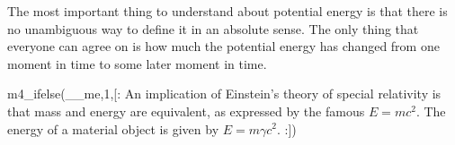 \begin{summary}
\begin{summarytext}
The most important thing to understand about potential
energy is that there is no unambiguous way to define it in
an absolute sense. The only thing that everyone can agree on
is how much the potential energy has changed from one moment
in time to some later moment in time.

m4_ifelse(__me,1,[:%
An implication of Einstein's theory of special relativity is that
mass and energy are equivalent, as expressed by the famous
$E=mc^2$. The energy of a material object is given by $E=m\gamma c^2$.
:])

\end{summarytext}

\end{summary}
